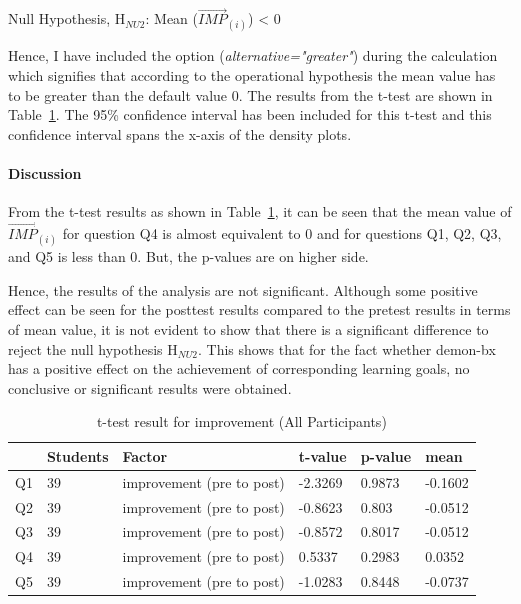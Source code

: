Null Hypothesis, {H$_{NU2}$}: Mean ($\overrightarrow{\textit{IMP}}$\textit{$_{(i)}$}) < 0

Hence, I have included the option (\textit{alternative="greater"}) during the calculation which signifies that according to the operational hypothesis the mean value has to be greater than the default value 0. The results from the t-test are shown in Table~\ref{tab:t-test_PrePostTest}. The 95\% confidence interval has been included for this t-test and this confidence interval spans the x-axis of the density plots.

\paragraph{Discussion}
From the t-test results as shown in Table~\ref{tab:t-test_PrePostTest}, it can be seen that the mean value of $\overrightarrow{\textit{IMP}}$\textit{$_{(i)}$} for question Q4 is almost equivalent to 0 and for questions Q1, Q2, Q3, and Q5 is less than 0. But, the p-values are on higher side.

Hence, the results of the analysis are not significant. Although some positive effect can be seen for the posttest results compared to the pretest results in terms of mean value, it is not evident to show that there is a significant difference to reject the null hypothesis {H$_{NU2}$}. This shows that for the fact whether demon-bx has a positive effect on the achievement of corresponding learning goals, no conclusive or significant results were obtained.

\begin{table}[ht]
	\centering	
	\begin{tabular}{|p{1cm}|p{1.5cm}|p{4.5cm}|p{1.5cm}|p{1.5cm}|p{1.5cm}|}
		\hline
		\rowcolor[gray]{.8}	
		\textbf{} & \textbf{Students} & \textbf{Factor} & \textbf{t-value} & \textbf{p-value} & \textbf{mean}\\
		\hline
		Q1 & 39 & improvement (pre to post) &  -2.3269 & 0.9873 & -0.1602\\
		\hline
		Q2 & 39 & improvement (pre to post) & -0.8623 & 0.803 & -0.0512\\
		\hline
		Q3 & 39 & improvement (pre to post) & -0.8572 & 0.8017 & -0.0512\\
		\hline	
		Q4 & 39 & improvement (pre to post) & 0.5337 & 0.2983 & 0.0352\\
		\hline
		Q5 & 39 & improvement (pre to post) & -1.0283 & 0.8448 & -0.0737\\
		\hline			
	\end{tabular}
	\caption{t-test result for improvement (All Participants)}
	\label{tab:t-test_PrePostTest}
\end{table}

